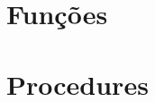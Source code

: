 \documentclass{article}
\begin{document}
\tableofcontents	

\section{Funções}


\section{Procedures}

\end{document}
